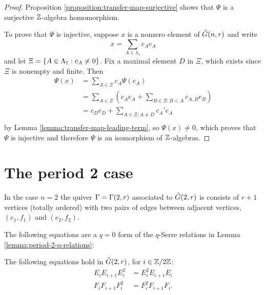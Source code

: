 \documentclass[a4paper, 11pt]{report}
\begin{document}
\begin{proof}
Proposition \ref{proposition:transfer-map-surjective} shows that $\Psi$ is a surjective $\integers$-algebra homomorphism.

To prove that $\Psi$ is injective, suppose $x$ is a nonzero element of $\generic$ and write
\begin{equation*}
x = \sum_{A\in\lambda_1} c_Ae_A
\end{equation*}
and let $\Xi=\{A\in\matrices:c_A\neq 0\}$. Fix a maximal element $D$ in $\Xi$, which exists since $\Xi$ is nonempty and finite. Then
\begin{align*}
\Psi(x)
&= \sum_{A\in\Xi} c_A\Psi(e_A)\\
&= \sum_{A\in\Xi} \left(c_Ae_A + \sum_{B\in\Xi:B<A} c_{A,B}e_B\right)\\
&= c_De_D + \sum_{A\in\Xi:A\neq D} c_A' e_A\\
\end{align*}
by Lemma \ref{lemma:transfer-map-leading-term}, so $\Psi(x)\neq 0$, which proves that $\Psi$ is injective and therefore $\Psi$ is an isomorphism of $\integers$-algebras. 
\end{proof}


\section{The period 2 case}

In the case $n=2$ the quiver $\Gamma=\presentationquiver[2,r]$ associated to $\generic[2,r]$ is consists of $r+1$ vertices (totally ordered) with two pairs of edges between adjacent vertices, $(e_1,f_1)$ and $(e_2,f_2)$.

The following equations are a $q=0$ form of the $q$-Serre relations in Lemma \ref{lemma:period-2-q-relations}:

\begin{lemma}\label{lemma:period-2-0-relations}
The following equations hold in $\generic[2,r]$, for $i\in\integers/{2\integers}$:
\begin{align*}
E_iE_{i+1}E_i^2 &= E_i^2E_{i+1}E_i\\
F_iF_{i+1}F_i^2 &= F_i^2F_{i+1}F_i.
\end{align*}
\end{lemma}
\end{document}
